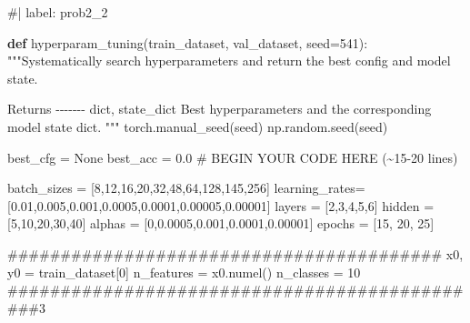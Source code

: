 \documentclass[
  letterpaper,
  DIV=11,
  numbers=noendperiod]{scrartcl}
\newenvironment{Shaded}{\begin{snugshade}}{\end{snugshade}}
\newcommand{\CommentTok}[1]{\textcolor[rgb]{0.37,0.37,0.37}{#1}}
\newcommand{\DecValTok}[1]{\textcolor[rgb]{0.68,0.00,0.00}{#1}}
\newcommand{\FloatTok}[1]{\textcolor[rgb]{0.68,0.00,0.00}{#1}}
\newcommand{\KeywordTok}[1]{\textcolor[rgb]{0.00,0.23,0.31}{\textbf{#1}}}
\newcommand{\NormalTok}[1]{\textcolor[rgb]{0.00,0.23,0.31}{#1}}
\newcommand{\OperatorTok}[1]{\textcolor[rgb]{0.37,0.37,0.37}{#1}}
\newcommand{\RegionMarkerTok}[1]{\textcolor[rgb]{0.00,0.23,0.31}{#1}}
\newcommand{\VariableTok}[1]{\textcolor[rgb]{0.07,0.07,0.07}{#1}}
\begin{document}
\begin{Shaded}
\begin{Highlighting}[]
\CommentTok{\#| label: prob2\_2}

\KeywordTok{def}\NormalTok{ hyperparam\_tuning(train\_dataset, val\_dataset, seed}\OperatorTok{=}\DecValTok{541}\NormalTok{):}
    \CommentTok{"""Systematically search hyperparameters and return the best config and model state.}

\CommentTok{    Returns}
\CommentTok{    {-}{-}{-}{-}{-}{-}{-}}
\CommentTok{    dict, state\_dict}
\CommentTok{        Best hyperparameters and the corresponding model state dict.}
\CommentTok{    """}
\NormalTok{    torch.manual\_seed(seed)}
\NormalTok{    np.random.seed(seed)}

\NormalTok{    best\_cfg }\OperatorTok{=} \VariableTok{None}
\NormalTok{    best\_acc }\OperatorTok{=} \FloatTok{0.0}
    \CommentTok{\# }\RegionMarkerTok{BEGIN}\CommentTok{ YOUR CODE HERE (\textasciitilde{}15{-}20 lines)}


\NormalTok{    batch\_sizes }\OperatorTok{=}\NormalTok{ [}\DecValTok{8}\NormalTok{,}\DecValTok{12}\NormalTok{,}\DecValTok{16}\NormalTok{,}\DecValTok{20}\NormalTok{,}\DecValTok{32}\NormalTok{,}\DecValTok{48}\NormalTok{,}\DecValTok{64}\NormalTok{,}\DecValTok{128}\NormalTok{,}\DecValTok{145}\NormalTok{,}\DecValTok{256}\NormalTok{]}
\NormalTok{    learning\_rates}\OperatorTok{=}\NormalTok{ [}\FloatTok{0.01}\NormalTok{,}\FloatTok{0.005}\NormalTok{,}\FloatTok{0.001}\NormalTok{,}\FloatTok{0.0005}\NormalTok{,}\FloatTok{0.0001}\NormalTok{,}\FloatTok{0.00005}\NormalTok{,}\FloatTok{0.00001}\NormalTok{]}
\NormalTok{    layers }\OperatorTok{=}\NormalTok{ [}\DecValTok{2}\NormalTok{,}\DecValTok{3}\NormalTok{,}\DecValTok{4}\NormalTok{,}\DecValTok{5}\NormalTok{,}\DecValTok{6}\NormalTok{]}
\NormalTok{    hidden }\OperatorTok{=}\NormalTok{ [}\DecValTok{5}\NormalTok{,}\DecValTok{10}\NormalTok{,}\DecValTok{20}\NormalTok{,}\DecValTok{30}\NormalTok{,}\DecValTok{40}\NormalTok{]}
\NormalTok{    alphas }\OperatorTok{=}\NormalTok{ [}\DecValTok{0}\NormalTok{,}\FloatTok{0.0005}\NormalTok{,}\FloatTok{0.001}\NormalTok{,}\FloatTok{0.0001}\NormalTok{,}\FloatTok{0.00001}\NormalTok{]}
\NormalTok{    epochs }\OperatorTok{=}\NormalTok{ [}\DecValTok{15}\NormalTok{, }\DecValTok{20}\NormalTok{, }\DecValTok{25}\NormalTok{]}


    \CommentTok{\#\#\#\#\#\#\#\#\#\#\#\#\#\#\#\#\#\#\#\#\#\#\#\#\#\#\#\#\#\#\#\#\#\#\#\#\#\#\#\#\#}
\NormalTok{    x0, y0 }\OperatorTok{=}\NormalTok{ train\_dataset[}\DecValTok{0}\NormalTok{]}
\NormalTok{    n\_features }\OperatorTok{=}\NormalTok{ x0.numel()}
\NormalTok{    n\_classes  }\OperatorTok{=} \DecValTok{10}
    \CommentTok{\#\#\#\#\#\#\#\#\#\#\#\#\#\#\#\#\#\#\#\#\#\#\#\#\#\#\#\#\#\#\#\#\#\#\#\#\#\#\#\#\#\#\#\#\#\#3}



\end{Highlighting}
\end{Shaded}
\end{document}
